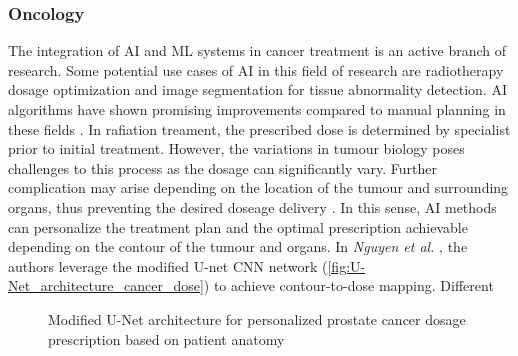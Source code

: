 \documentclass{article}
\begin{document}
\subsubsection{Oncology}
The integration of AI and ML systems in cancer treatment is an active branch of research.
Some potential use cases of AI in this field of research are radiotherapy dosage optimization and image segmentation for tissue abnormality detection. AI algorithms have shown promising improvements compared to manual planning in these fields \cite{thompson_artificial_2018}.
In rafiation treament, the prescribed dose is determined by specialist prior to initial treatment. However, the variations in tumour biology poses challenges to this process as the dosage can significantly vary. Further complication may arise depending on the location of the tumour and surrounding organs, thus preventing the desired doseage delivery \cite{huynh_artificial_2020}. In this sense, AI methods can personalize the treatment plan and the optimal prescription achievable depending on the contour of the tumour and organs.
In \textit{Nguyen et al.} \cite{}, the authors leverage the modified U-net CNN network (\autoref{fig:U-Net_architecture_cancer_dose}) to achieve contour-to-dose mapping. Different 

\begin{figure}[htbp]
    \caption{Modified U-Net architecture for personalized prostate cancer dosage prescription based on patient anatomy}
    \label{fig:U-Net_architecture_cancer_dose}
\end{figure}
\end{document}
